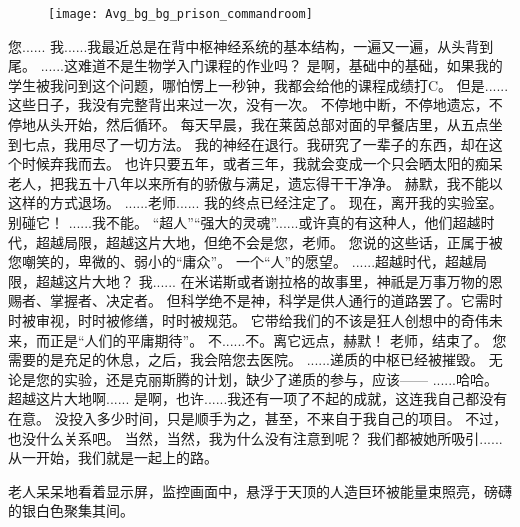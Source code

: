 \documentclass[openany]{book}
\begin{document}
\begin{figure}[h]
    \centering
    \texttt{[image: Avg\_bg\_bg\_prison\_commandroom]}
\end{figure}
\begin{dialogue}
     您......
     我......我最近总是在背中枢神经系统的基本结构，一遍又一遍，从头背到尾。
     ......这难道不是生物学入门课程的作业吗？
     是啊，基础中的基础，如果我的学生被我问到这个问题，哪怕愣上一秒钟，我都会给他的课程成绩打C。
     但是......这些日子，我没有完整背出来过一次，没有一次。
     不停地中断，不停地遗忘，不停地从头开始，然后循环。
     每天早晨，我在莱茵总部对面的早餐店里，从五点坐到七点，我用尽了一切方法。
     我的神经在退行。我研究了一辈子的东西，却在这个时候弃我而去。
     也许只要五年，或者三年，我就会变成一个只会晒太阳的痴呆老人，把我五十八年以来所有的骄傲与满足，遗忘得干干净净。
     赫默，我不能以这样的方式退场。
     ......老师......
     我的终点已经注定了。
     现在，离开我的实验室。别碰它！
     ......我不能。
     “超人”“强大的灵魂”......或许真的有这种人，他们超越时代，超越局限，超越这片大地，但绝不会是您，老师。
     您说的这些话，正属于被您嘲笑的，卑微的、弱小的“庸众”。
     一个“人”的愿望。
     ......超越时代，超越局限，超越这片大地？
     我......
     在米诺斯或者谢拉格的故事里，神祇是万事万物的恩赐者、掌握者、决定者。
     但科学绝不是神，科学是供人通行的道路罢了。它需时时被审视，时时被修缮，时时被规范。
     它带给我们的不该是狂人创想中的奇伟未来，而正是“人们的平庸期待”。
     不......不。离它远点，赫默！
     老师，结束了。
     您需要的是充足的休息，之后，我会陪您去医院。
     ......递质的中枢已经被摧毁。
     无论是您的实验，还是克丽斯腾的计划，缺少了递质的参与，应该——
     ......哈哈。
     超越这片大地啊......
     是啊，也许......我还有一项了不起的成就，这连我自己都没有在意。
     没投入多少时间，只是顺手为之，甚至，不来自于我自己的项目。
     不过，也没什么关系吧。
     当然，当然，我为什么没有注意到呢？
     我们都被她所吸引......从一开始，我们就是一起上的路。\par
    老人呆呆地看着显示屏，监控画面中，悬浮于天顶的人造巨环被能量束照亮，磅礴的银白色聚集其间。\par

\end{dialogue}
\end{document}
